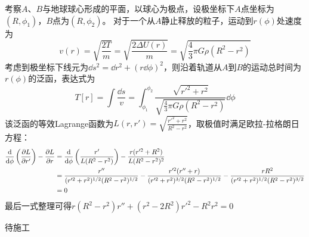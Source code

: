 \begin{solution}
    考察\(A\)、\(B\)与地球球心形成的平面，以球心为极点，设极坐标下\(A\)点坐标为\( (R,\phi_1) \)，\(B\)点为\( (R,\phi_2) \)。
    对于一个从\(A\)静止释放的粒子，运动到\( r(\phi) \)处速度为
    \[
        v(r) = \sqrt{\frac{2T}{m}} = \sqrt{\frac{2\Delta U(r)}{m}} = \sqrt{\frac43 \pi G \rho (R^2-r^2)}
    \]
    考虑到极坐标下线元为\( \dd s^2 = \dd r^2 + (r\dd \phi)^2 \)，则沿着轨道从\(A\)到\(B\)的运动总时间为\( r(\phi) \)的泛函，表达式为
    \[
        T[r] = \int \frac{\dd s}{v}
             = \int_{\phi_1}^{\phi_2} \frac{ \sqrt{r'^2+r^2} }{ \sqrt{\frac43 \pi G \rho (R^2-r^2)} }\dd \phi
    \]
    该泛函的等效Lagrange函数为\( L(r,r')= \sqrt{\frac{r'^2+r^2}{R^2-r^2}} \)，取极值时满足欧拉-拉格朗日方程：
    \[
    \begin{aligned}
        \frac{\dd}{\dd \phi} \left( \frac{\partial L}{\partial r'} \right) - \frac{\partial L}{\partial r}
        & = \frac{\dd}{\dd \phi} \left( \frac{r'}{L(R^2-r^2)} \right) - \frac{r(r'^2+R^2)}{L(R^2-r^2)^2} \\
        & = \frac{r''}{(r'^2+r^2)^{1/2}(R^2-r^2)^{1/2}} - 
            \frac{r'^2(r''+r)}{(r'^2+r^2)^{3/2}(R^2-r^2)^{1/2}} - 
            \frac{rR^2}{(r'^2+r^2)^{1/2}(R^2-r^2)^{3/2}} \\
        & = 0
    \end{aligned}
    \]
    最后一式整理可得\( r(R^2-r^2)r''+(r^2-2R^2)r'^2-R^2r^2 = 0 \)
\end{solution}

\begin{solution}
    待施工
\end{solution}

